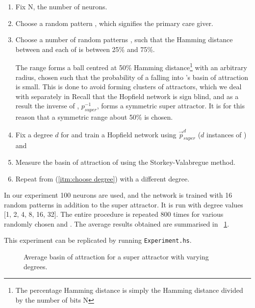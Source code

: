 \begin{enumerate}


\item Fix N, the number of neurons.

\item Choose a random pattern \psuper, which signifies the primary care giver.

\item Choose a number of random patterns \prandom, such that the Hamming distance between \psuper and each of \prandom is between 25\% and 75\%.

The range forms a ball centred at 50\% Hamming distance\footnote{The percentage Hamming distance is simply the Hamming distance divided by the number of bits N} with an arbitrary radius, chosen such that the probability of a \prandom falling into \psuper's basin of attraction is small. This is done to avoid forming clusters of attractors, which we deal with separately in  Recall that the Hopfield network is sign blind, and as a result the inverse of \psuper, $p_{super}^{-1}$, forms a symmetric super attractor. It is for this reason that a symmetric range about 50\% is chosen.

\item \label{itm:choose degree} Fix a degree $d$ for \psuper and train a Hopfield network using $\overrightarrow{p}^d_{super}$ ($d$ instances of \psuper) and \prandom

\item Measure the basin of attraction of \psuper using the Storkey-Valabregue method. 

\item Repeat from (\ref{itm:choose degree}) with a different degree.

\end{enumerate}


In our experiment 100 neurons are used, and the network is trained with 16 random patterns in addition to the super attractor. It is run with degree values {[}1, 2, 4, 8, 16, 32{]}. The entire procedure is repeated 800 times for various randomly chosen \psuper and \prandom. The average results obtained are summarised in ~\ref{fig:one super plot}.

This experiment can be replicated by running \texttt{Experiment.hs}. 

\begin{figure}[h]
  \centering

\caption{Average basin of attraction for a super attractor with varying degrees.}
\label{fig:one super plot}
\end{figure}


